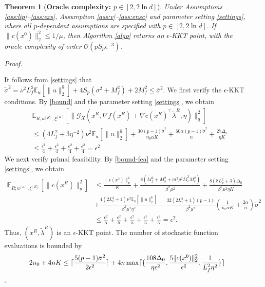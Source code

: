 \documentclass[11pt]{article}
\newtheorem{theorem}{Theorem}[section]
\newenvironment{proof}[1][Proof]{%
    \par\noindent\textit{#1.}\enspace
  }{%
    \hfill\ensuremath{\square}\par
  }%
\numberwithin{equation}{section}
\newcommand{\E}{\mathbb{E}}
\begin{document}
\begin{theorem}[{\bf {Oracle} complexity:  $p\in{[2,{2\ln d}]}$}]\label{thm:p}
Under Assumptions \ref{ass:lip}--\ref{ass:exs},  Assumption \ref{ass:v}--\ref{ass:ensc} and parameter setting \eqref{settings}, where all \(p\)-dependent assumptions are specified with \(p \in [2, 2\ln d]\). If \(\|c(x^0)\|_2^2\le 1/\mu\), then   Algorithm \ref{algo} returns an \(\epsilon\)-KKT point, with the oracle complexity of order  \(\mathcal{O}(pS_p\epsilon^{-3})\).
\end{theorem}
\begin{proof}
It follows from \eqref{settings} that \(\tilde{\sigma}^2= \nu^2 L_f^2 \E_u[\|u\|_2^6]+4 S_p (\sigma^2+M_f^2)+ 2M_f^2\leq \bar{\sigma}^2\).
We first verify the $\epsilon$-KKT conditions. 
By \eqref{bound} and the parameter setting \eqref{settings}, we obtain
\[
\begin{aligned}
&\E_{R;u^{[K]},\xi^{[K]}}
[
\|
\mathcal{G}_X
(
x^R,\nabla f(x^R)
+\nabla c(x^R)^\top\tilde{\lambda}^R,\eta
)
\|_q^2
]                                                     \\
&\leq
(4L_f^2+3\eta^{-2})\nu^2\E_u[\|u\|_2^6]
+\frac{30(p-1)\tilde{\sigma}^2}{n_0\alpha K}
+\frac{60\alpha(p-1)\tilde{\sigma}^2}{n}
+\frac{27\Delta_0}{\eta K}\\
&\leq \frac{\epsilon^2}{4}+\frac{\epsilon^2}{4}+\frac{\epsilon^2}{4}+\frac{\epsilon^2}{4}
= \epsilon^2
\end{aligned}
\]
We next verify primal feasibility.  By \eqref{bound-fea} and the parameter setting \eqref{settings}, we obtain
\[
\begin{aligned}
\mathbb{E}_{R;u^{[K]},\xi^{[K]}} [  \|  c ( x^R  )  \|_p^2]  
        &\leq \frac{\|c(x^0)\|_p^2}{K} + \frac{8(M_f^2+M_h^2+m^2\rho^2\bar{M}_c^2M_c^2)}{\beta^2 \mu^2 }
        +\frac{8(8L_v^2+3)\Delta_0}{\beta^2\mu^2\eta K}\\&+\frac{4(2L_v^2+1)\nu^2\E_u[\|u\|_2^6]}{\beta^2\mu^2\eta^2} +\frac{32(2L_v^2+1)(p-1)}{\beta^2\mu^2}(\frac{1}{n_0 \alpha K} + \frac{2\alpha}{n})\tilde \sigma^2\\
        &\leq \frac{\epsilon^2}{5}+\frac{\epsilon^2}{5}+\frac{\epsilon^2}{5}+\frac{\epsilon^2}{5}+\frac{\epsilon^2}{5}=\epsilon^2.
\end{aligned}
\]
Thus, $(x^R,\tilde{\lambda}^R)$ is an $\epsilon$-KKT point.
The number of stochastic function evaluations is bounded by
\begin{align} 
&  2n_0 + 4nK 
\leq \lceil\frac{5(p-1)\bar \sigma^2}{2\epsilon^2}\rceil + 4n\max \lceil\{\frac{108\Delta_0}{\eta\epsilon^2}, \frac{5\|c(x^0)\|_2^2}{\epsilon^2},\frac{1}{L_f^2\eta^2}\}\rceil \notag \\

\end{align}
\end{proof}
\end{document}
